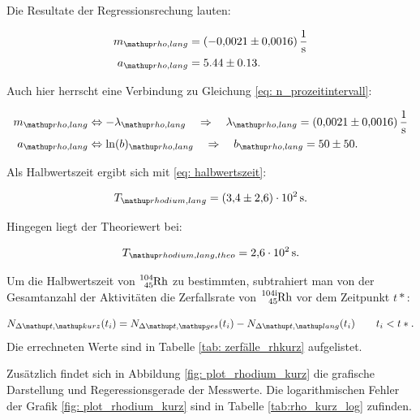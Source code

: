 Die Resultate der Regressionsrechung lauten:

\begin{align}
  \label{eq:parameter_rhodium_lang}
  \begin{aligned}
    m\ua{rho,lang}&=\SI{-0.0021\pm0.0016}{\per\second}\\
    a\ua{rho,lang}&=5.44\pm0.13.
  \end{aligned}
\end{align}


Auch hier herrscht eine Verbindung zu Gleichung \eqref{eq: n_prozeitintervall}:

\begin{align}
  \label{eq:parameter_rhodium_lang_lambda}
  \begin{aligned}
    m\ua{rho,lang}&\Leftrightarrow -\lambda\ua{rho,lang} \quad \Rightarrow \quad \lambda\ua{rho,lang}=\SI{0.0021\pm0.0016}{\per\second}\\
    a\ua{rho,lang}&\Leftrightarrow \ln(b)\ua{rho,lang} \quad \Rightarrow \quad b\ua{rho,lang} =50\pm 50.
  \end{aligned}
\end{align}

Als Halbwertszeit ergibt sich mit \eqref{eq: halbwertszeit}:

\begin{equation}
  \label{eq:halbwertzeit_rhodium}
  T\ua{rhodium, lang}=\SI{3.4\pm2.6 e+2}{\second}.
\end{equation}

Hingegen liegt der Theoriewert\cite{rhodium_lang_halb} bei:

\begin{equation}
  \label{eq:halbwertzeit_rhodium_theo}
  T\ua{rhodium, lang, theo}=\SI{2.6 e+2}{\second}.
\end{equation}


Um die Halbwertszeit von $\ce{^{104}_{45} Rh}$ zu bestimmten, subtrahiert man von der
Gesamtanzahl der Aktivitäten die Zerfallsrate von $\ce{^{104i}_{45} Rh}$ vor dem
Zeitpunkt $t*$:

\begin{equation*}
  N_{\Delta \map{t}, \map{kurz}}(t_i)=N_{\Delta \map{t}, \map{ges}}(t_i)-N_{\Delta \map{t}, \map{lang}}(t_i) \qquad t_i<t*.
\end{equation*}
Die errechneten Werte sind in Tabelle \ref{tab: zerfälle_rhkurz} aufgelistet.


Zusätzlich findet sich in Abbildung \ref{fig: plot_rhodium_kurz} die grafische Darstellung
und Regeressionsgerade der Messwerte. Die logarithmischen Fehler der Grafik \ref{fig: plot_rhodium_kurz}
sind in Tabelle \ref{tab:rho_kurz_log} zufinden.


